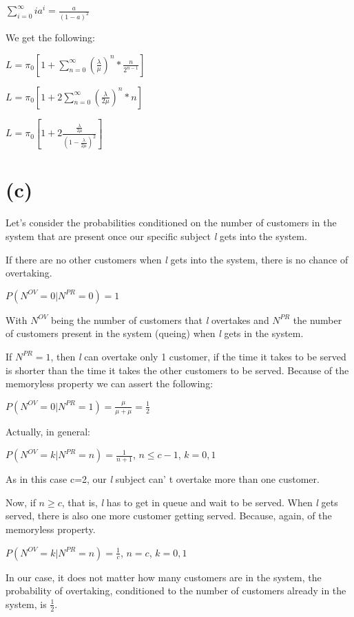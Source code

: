 \documentclass[]{article}
\begin{document}
\(\sum_{i=0}^{\infty} i a^i = \frac{a}{(1-a)^2}\)

We get the following:

\(L = \pi_0 [1 + \sum_{n=0}^{\infty} (\frac{\lambda}{\mu})^n * \frac{n}{2^{n-1}}]\)

\(L = \pi_0 [1 + 2 \sum_{n=0}^{\infty} (\frac{\lambda}{2 \mu})^n * n]\)

\(L = \pi_0 [1 + 2 \frac{\frac{\lambda}{2 \mu}}{(1 - \frac{\lambda}{2 \mu})^2}]\)

\newpage

\hypertarget{c-1}{%
\section{(c)}\label{c-1}}

Let's consider the probabilities conditioned on the number of customers
in the system that are present once our specific subject \emph{l} gets
into the system.

If there are no other customers when \emph{l} gets into the system,
there is no chance of overtaking.

\(P(N^{OV} = 0 | N^{PR} = 0) = 1\)

With \(N^{OV}\) being the number of customers that \emph{l} overtakes
and \(N^{PR}\) the number of customers present in the system (queing)
when \emph{l} gets in the system.

If \(N^{PR} = 1\), then \emph{l} can overtake only 1 customer, if the
time it takes to be served is shorter than the time it takes the other
customers to be served. Because of the memoryless property we can assert
the following:

\(P(N^{OV} = 0 | N^{PR} = 1) = \frac{\mu}{\mu + \mu} = \frac{1}{2}\)

Actually, in general:

\(P(N^{OV} = k | N^{PR} = n) = \frac{1}{n+1}\), \(n \leq c - 1\),
\(k = 0,1\)

As in this case c=2, our \emph{l} subject can' t overtake more than one
customer.

Now, if \(n \geq c\), that is, \emph{l} has to get in queue and wait to
be served. When \emph{l} gets served, there is also one more customer
getting served. Because, again, of the memoryless property.

\(P(N^{OV} = k | N^{PR} = n) = \frac{1}{c}\), \(n = c\), \(k = 0,1\)

In our case, it does not matter how many customers are in the system,
the probability of overtaking, conditioned to the number of customers
already in the system, is \(\frac{1}{2}\).
\end{document}
